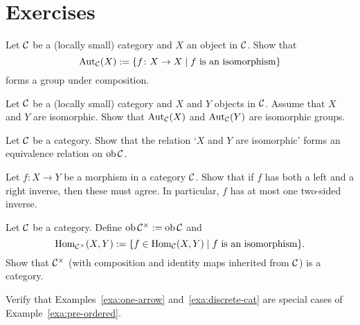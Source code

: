 \newpage
\section*{Exercises}

\begin{exercise}
Let ${\mathcal{C}}$ be a (locally small) category and $X$ an object in ${\mathcal{C}}$. Show that
\[
	\operatorname{\mathrm{Aut}}_{\mathcal{C}}(X) := \{ f\colon X\to X \mid \text{$f$ is an isomorphism} \}
\]
forms a group under composition.
\end{exercise}

\begin{exercise}
Let ${\mathcal{C}}$ be a (locally small) category and $X$ and $Y$ objects in ${\mathcal{C}}$. Assume that $X$ and $Y$ are isomorphic. Show that $\operatorname{\mathrm{Aut}}_{\mathcal{C}}(X)$ and $\operatorname{\mathrm{Aut}}_{\mathcal{C}}(Y)$ are isomorphic groups.
\end{exercise}

\begin{exercise}
Let ${\mathcal{C}}$ be a category. Show that the relation `$X$ and $Y$ are isomorphic' forms an equivalence relation on $\operatorname{ob} {\mathcal{C}}$.
\end{exercise}

\begin{exercise}
Let $f\colon X\to Y$ be a morphism in a category ${\mathcal{C}}$. Show that if $f$ has both a left and a right inverse, then these must agree. In particular, $f$ has at most one two-sided inverse.
\end{exercise}

\begin{exercise}\label{exc:iso-category}
Let ${\mathcal{C}}$ be a category. Define $\operatorname{ob} {\mathcal{C}}^\times := \operatorname{ob} {\mathcal{C}}$ and
\[
	\operatorname{Hom}_{{\mathcal{C}}^\times}(X,Y) := \{ f \in \operatorname{Hom}_{\mathcal{C}}(X,Y) \mid \text{$f$ is an isomorphism} \}.
\]
Show that ${\mathcal{C}}^\times$ (with composition and identity maps inherited from ${\mathcal{C}}$) is a category.
\end{exercise}

\begin{exercise}Verify that Examples~\ref{exa:one-arrow}  and~\ref{exa:discrete-cat} are special cases of Example~\ref{exa:pre-ordered}.
\end{exercise}

%
%

